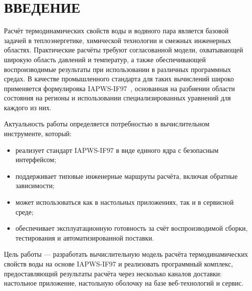 \clearpage
\chapter*{ВВЕДЕНИЕ}

Расчёт термодинамических свойств воды и водяного пара является базовой задачей в теплоэнергетике, химической технологии и смежных инженерных областях.
Практические расчёты требуют согласованной модели, охватывающей широкую область давлений и температур, а также обеспечивающей воспроизводимые результаты при использовании в различных программных средах.
В качестве промышленного стандарта для таких вычислений широко применяется формулировка IAPWS-IF97~\cite{iapws_if97_2012}, основанная на разбиении области состояния на регионы и использовании специализированных уравнений для каждого из них.

Актуальность работы определяется потребностью в вычислительном инструменте, который:
\begin{itemize}
\item реализует стандарт IAPWS-IF97 в виде единого ядра с безопасным интерфейсом;
\item поддерживает типовые инженерные маршруты расчёта, включая обратные зависимости;
\item может использоваться как в настольных приложениях, так и в сервисной среде;
\item обеспечивает эксплуатационную готовность за счёт воспроизводимой сборки,
тестирования и автоматизированной поставки.
\end{itemize}

Цель работы --- разработать вычислительную модель расчёта термодинамических свойств воды на основе IAPWS-IF97
и реализовать программный комплекс,
предоставляющий результаты расчёта через несколько каналов доставки:
настольное приложение,
настольную оболочку на базе веб-технологий
и сервис.

